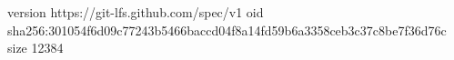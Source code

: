 version https://git-lfs.github.com/spec/v1
oid sha256:301054f6d09c77243b5466baccd04f8a14fd59b6a3358ceb3c37c8be7f36d76c
size 12384

